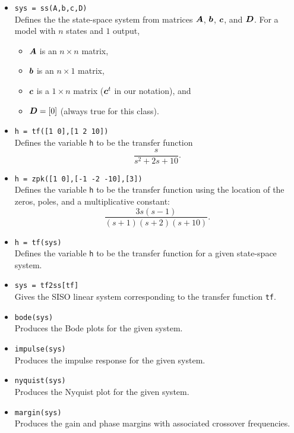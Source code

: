 \begin{itemize}
    \item \verb|sys = ss(A,b,c,D)|\\
          Defines the the state-space system from matrices \(\boldsymbol{A}\), \(\boldsymbol{b}\),
          \(\boldsymbol{c}\), and \(\boldsymbol{D}\).  For a model with \(n\) states and \(1\) output,
          \begin{itemize}
              \item \(\boldsymbol{A}\) is an \(n\times n\) matrix,
              \item \(\boldsymbol{b}\) is an \(n\times 1\) matrix,
              \item \(\boldsymbol{c}\) is a \(1\times n\) matrix (\(\boldsymbol{c}^{t}\) in our notation),
                    and
              \item \(\boldsymbol{D}=[0]\) (always true for this class).
          \end{itemize}


    \item \verb|h = tf([1 0],[1 2 10])|\\
          Defines the variable \verb|h| to be the transfer function
          \begin{equation*}
              \frac{s}{s^{2}+2s+10}.
          \end{equation*}

    \item \verb|h = zpk([1 0],[-1 -2 -10],[3])|\\
          Defines the variable \verb|h| to be the transfer function using the location
          of the zeros, poles, and a multiplicative constant:
          \begin{equation*}
              \frac{3s(s-1)}{(s+1)(s+2)(s+10)}.
          \end{equation*}

    \item \verb|h = tf(sys)|\\
          Defines the variable \verb|h| to be the transfer function for a given
          state-space system.

    \item \verb|sys = tf2ss[tf]|\\
          Gives the SISO linear system corresponding to the transfer function \verb|tf|.

    \item \verb|bode(sys)|\\
          Produces the Bode plots for the given system.

    \item \verb|impulse(sys)|\\
          Produces the impulse response for the given system.

    \item \verb|nyquist(sys)|\\
          Produces the Nyquist plot for the given system.

    \item \verb|margin(sys)|\\
          Produces the gain and phase margins with associated crossover frequencies.
\end{itemize}

